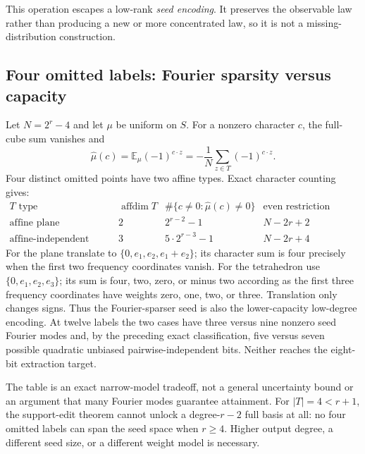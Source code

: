This operation escapes a low-rank \emph{seed encoding}. It preserves the
observable law rather than producing a new or more concentrated law,
so it is not a missing-distribution construction.

\subsection{Four omitted labels: Fourier sparsity versus capacity}
Let $N=2^r-4$ and let $\mu$ be uniform on $S$. For a nonzero character
$c$, the full-cube sum vanishes and
\[
 \widehat\mu(c)=\mathbb E_\mu(-1)^{c\cdot z}
 =-\frac1N\sum_{z\in T}(-1)^{c\cdot z}.
\]
Four distinct omitted points have two affine types. Exact character
counting gives:
\[
 \begin{array}{c|c|c|c}
 T\text{ type}&\operatorname{affdim}T&
 \#\{c\ne0:\widehat\mu(c)\ne0\}&
 \text{even restriction bilinear rank}\\\hline
 \text{affine plane}&2&2^{r-2}-1&N-2r+2\\
 \text{affine-independent tetrahedron}&3&5\cdot2^{r-3}-1&N-2r+4
 \end{array}
\]
For the plane translate to $\{0,e_1,e_2,e_1+e_2\}$; its character sum
is four precisely when the first two frequency coordinates vanish.
For the tetrahedron use $\{0,e_1,e_2,e_3\}$; its sum is four, two,
zero, or minus two according as the first three frequency coordinates
have weights zero, one, two, or three. Translation only changes signs.
Thus the Fourier-sparser seed is also the lower-capacity low-degree
encoding. At twelve labels the two cases have three versus nine nonzero
seed Fourier modes and, by the preceding exact classification, five
versus seven possible quadratic unbiased pairwise-independent bits.
Neither reaches the eight-bit extraction target.

The table is an exact narrow-model tradeoff, not a general uncertainty
bound or an argument that many Fourier modes guarantee attainment.
For $|T|=4<r+1$, the support-edit theorem cannot unlock a degree-$r-2$
full basis at all: no four omitted labels can span the seed space when
$r\ge4$. Higher output degree, a different seed size, or a different
weight model is necessary.

